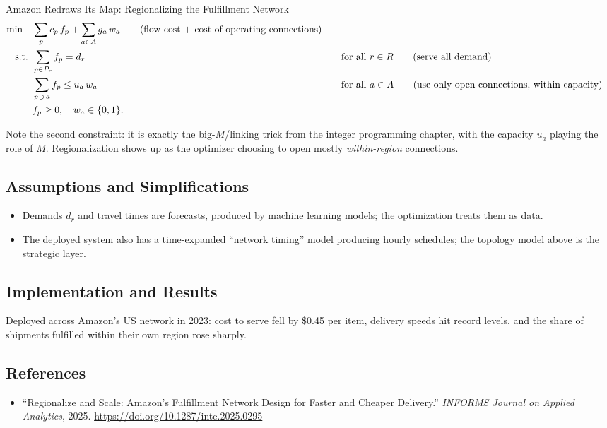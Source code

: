 \begin{casestudybox}{Amazon Redraws Its Map: Regionalizing the Fulfillment Network}
\begin{align*}
\min \quad & \sum_{p} c_p\, f_p + \sum_{a \in A} g_a\, w_a   \tag{flow cost + cost of operating connections} \\
\mbox{ s.t. }        & \sum_{p \in P_r} f_p = d_r &&\quad \mbox{for all } r \in R   \tag{serve all demand} \\
           & \sum_{p \,\ni\, a} f_p \leq u_a\, w_a &&\quad \mbox{for all } a \in A   \tag{use only open connections, within capacity} \\
           & f_p \geq 0, \quad w_a \in \{0,1\}.
\end{align*}

Note the second constraint: it is exactly the big-$M$/linking trick from the integer programming chapter, with the capacity $u_a$ playing the role of $M$.  Regionalization shows up as the optimizer choosing to open mostly \emph{within-region} connections.

\subsection*{Assumptions and Simplifications}
\begin{itemize}
\item Demands $d_r$ and travel times are forecasts, produced by machine learning models; the optimization treats them as data.
\item The deployed system also has a time-expanded ``network timing'' model producing hourly schedules; the topology model above is the strategic layer.
\end{itemize}

\subsection*{Implementation and Results}
Deployed across Amazon's US network in 2023: cost to serve fell by \$0.45 per item, delivery speeds hit record levels, and the share of shipments fulfilled within their own region rose sharply.

\subsection*{References}
\begin{itemize}
\item ``Regionalize and Scale: Amazon's Fulfillment Network Design for Faster and Cheaper Delivery.'' \emph{INFORMS Journal on Applied Analytics}, 2025. \url{https://doi.org/10.1287/inte.2025.0295}
\end{itemize}
\end{casestudybox}

